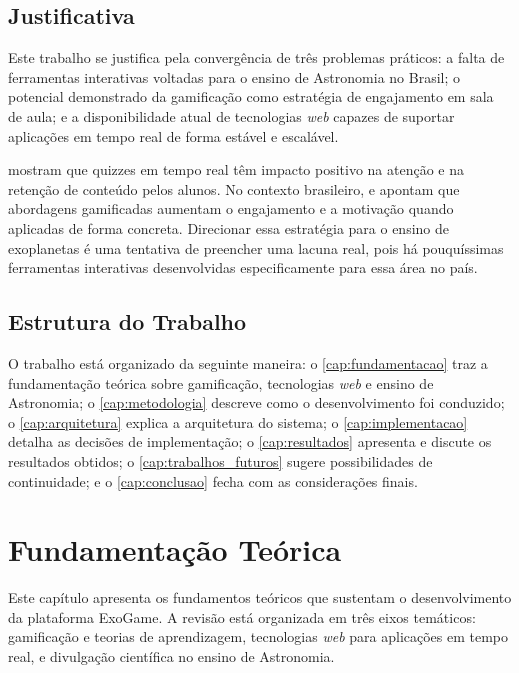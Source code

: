 \documentclass[
	12pt,
	openany,
	oneside,
	a4paper,
	english,
	brazil
]{abntex2}
\begin{document}
\section{Justificativa}

Este trabalho se justifica pela convergência de três problemas práticos: a falta de ferramentas interativas voltadas para o ensino de Astronomia no Brasil; o potencial demonstrado da gamificação como estratégia de engajamento em sala de aula; e a disponibilidade atual de tecnologias \textit{web} capazes de suportar aplicações em tempo real de forma estável e escalável.

 mostram que quizzes em tempo real têm impacto positivo na atenção e na retenção de conteúdo pelos alunos. No contexto brasileiro,  e  apontam que abordagens gamificadas aumentam o engajamento e a motivação quando aplicadas de forma concreta. Direcionar essa estratégia para o ensino de exoplanetas é uma tentativa de preencher uma lacuna real, pois há pouquíssimas ferramentas interativas desenvolvidas especificamente para essa área no país.

\section{Estrutura do Trabalho}

O trabalho está organizado da seguinte maneira: o \autoref{cap:fundamentacao} traz a fundamentação teórica sobre gamificação, tecnologias \textit{web} e ensino de Astronomia; o \autoref{cap:metodologia} descreve como o desenvolvimento foi conduzido; o \autoref{cap:arquitetura} explica a arquitetura do sistema; o \autoref{cap:implementacao} detalha as decisões de implementação; o \autoref{cap:resultados} apresenta e discute os resultados obtidos; o \autoref{cap:trabalhos_futuros} sugere possibilidades de continuidade; e o \autoref{cap:conclusao} fecha com as considerações finais.



\chapter{Fundamentação Teórica}\label{cap:fundamentacao}
 
Este capítulo apresenta os fundamentos teóricos que sustentam o desenvolvimento da plataforma ExoGame. A revisão está organizada em três eixos temáticos: gamificação e teorias de aprendizagem, tecnologias \textit{web} para aplicações em tempo real, e divulgação científica no ensino de Astronomia.
 
\end{document}
